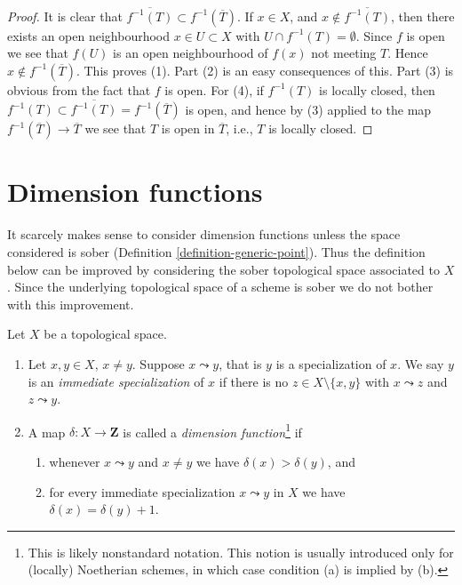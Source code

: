 \begin{proof}
It is clear that $\overline{f^{-1}(T)} \subset f^{-1}(\overline{T})$.
If $x \in X$, and $x \not \in \overline{f^{-1}(T)}$, then there
exists an open neighbourhood $x \in U \subset X$ with
$U \cap f^{-1}(T) = \emptyset$. Since $f$ is open we see that
$f(U)$ is an open neighbourhood of $f(x)$ not meeting $T$.
Hence $x \not \in f^{-1}(\overline{T})$. This proves (1).
Part (2) is an easy consequences of this.
Part (3) is obvious from the fact that $f$ is open.
For (4), if $f^{-1}(T)$
is locally closed, then
$f^{-1}(T) \subset \overline{f^{-1}(T)} = f^{-1}(\overline{T})$
is open, and hence by (3) applied to the map
$f^{-1}(\overline{T}) \to \overline{T}$ we see that
$T$ is open in $\overline{T}$, i.e., $T$ is locally closed.
\end{proof}







\section{Dimension functions}
\label{section-dimension-function}

\noindent
It scarcely makes sense to consider dimension functions unless the space
considered is sober (Definition \ref{definition-generic-point}). Thus the
definition below can be improved by considering the sober topological space
associated to $X$. Since the underlying topological space of a scheme
is sober we do not bother with this improvement.

\begin{definition}
\label{definition-dimension-function}
Let $X$ be a topological space.
\begin{enumerate}
\item  Let $x, y \in X$, $x \not = y$. Suppose $x \leadsto y$, that
is $y$ is a specialization of $x$.
We say $y$ is an {\it immediate specialization}
of $x$ if there is no
$z \in X \setminus \{x, y\}$ with $x \leadsto z$ and $z \leadsto y$.
\item A map $\delta : X \to \mathbf{Z}$ is called a
{\it dimension function}\footnote{This is likely nonstandard
notation. This notion is usually introduced only for (locally) Noetherian
schemes, in which case condition (a) is implied by (b).} if
\begin{enumerate}
\item whenever $x \leadsto y$ and $x \not = y$
we have $\delta(x) > \delta(y)$, and
\item for every immediate specialization $x \leadsto y$ in $X$
we have $\delta(x) = \delta(y) + 1$.
\end{enumerate}
\end{enumerate}
\end{definition}

